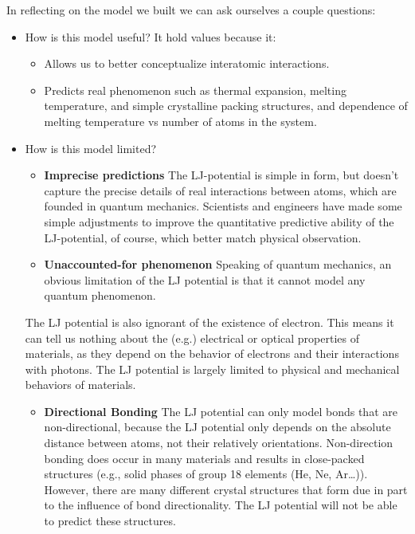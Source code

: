 \documentclass{book}
\providecommand{\tightlist}{%
  \setlength{\itemsep}{0pt}\setlength{\parskip}{0pt}}
\begin{document}
In reflecting on the model we built we can ask ourselves a couple questions:

\begin{itemize}
\item
  How is this model useful? It hold values because it:

  \begin{itemize}
  \tightlist
  \item
    Allows us to better conceptualize interatomic interactions.
  \item
    Predicts real phenomenon such as thermal expansion, melting temperature,
    and simple crystalline packing structures, and dependence of melting
    temperature vs number of atoms in the system.
  \end{itemize}
\item
  How is this model limited?

  \begin{itemize}
  \tightlist
  \item
    \textbf{Imprecise predictions} The LJ-potential is simple in form, but
    doesn't capture the precise details of real interactions between atoms,
    which are founded in quantum mechanics. Scientists and engineers have made
    some simple adjustments to improve the quantitative predictive ability of
    the LJ-potential, of course, which better match physical observation.
  \item
    \textbf{Unaccounted-for phenomenon} Speaking of quantum mechanics, an
    obvious limitation of the LJ potential is that it cannot model any quantum
    phenomenon.
  \end{itemize}

  The LJ potential is also ignorant of the existence of electron. This means
  it can tell us nothing about the (e.g.) electrical or optical properties of
  materials, as they depend on the behavior of electrons and their
  interactions with photons. The LJ potential is largely limited to physical
  and mechanical behaviors of materials.

  \begin{itemize}
  \tightlist
  \item
    \textbf{Directional Bonding} The LJ potential can only model bonds that
    are non-directional, because the LJ potential only depends on the absolute
    distance between atoms, not their relatively orientations. Non-direction
    bonding does occur in many materials and results in close-packed
    structures (e.g., solid phases of group 18 elements (He, Ne, Ar\ldots)).
    However, there are many different crystal structures that form due in part
    to the influence of bond directionality. The LJ potential will not be able
    to predict these structures.
  \end{itemize}
\end{itemize}
\end{document}

